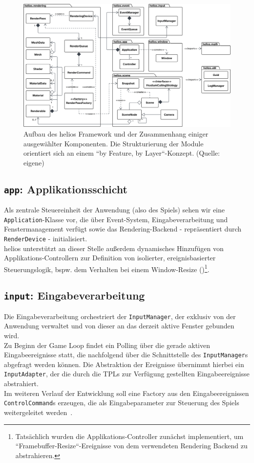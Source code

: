 \begin{figure}[t]
    \centering
    \includegraphics[width=1\textwidth]{img/package_diagram.svg}%
    \caption{Aufbau des helios Framework und der Zusammenhang einiger ausgewählter Komponenten. Die Strukturierung der Module orientiert sich an einem ``by Feature, by Layer``-Konzept. (Quelle: eigene)}
    \label{fig:package_diagram}
\end{figure}


\subsection*{\texttt{app}: Applikationsschicht}
Als zentrale Steuereinheit der Anwendung (also des Spiels) sehen wir eine \texttt{Application}-Klasse vor, die über Event-System, Eingabeverarbeitung und Fenstermanagement verfügt sowie das Rendering-Backend - repräsentiert durch \texttt{RenderDevice} - initialisiert.\\
helios unterstützt an dieser Stelle außerdem dynamisches Hinzufügen von Applikations-Controllern zur Definition von isolierter, ereignisbasierter Steuerungslogik, bspw. dem Verhalten bei einem Window-Resize (\cite[379]{Fow03})\footnote{
Tatsächlich wurden die Applikations-Controller zunächst implementiert, um ``Framebuffer-Resize``-Ereignisse von dem verwendeten Rendering Backend zu abstrahieren.
}.

\subsection*{\texttt{input}: Eingabeverarbeitung}
Die Eingabeverarbeitung orchestriert der \texttt{InputManager}, der exklusiv von der Anwendung verwaltet und von dieser an das derzeit aktive Fenster gebunden wird.\\
Zu Beginn der Game Loop findet ein Polling über die gerade aktiven Eingabeereignisse statt, die nachfolgend über die Schnittstelle des \texttt{InputManager}s abgefragt werden können.
Die Abstraktion der Ereignisse übernimmt hierbei ein \texttt{InputAdapter}, der die durch die TPLs zur Verfügung gestellten Eingabeereignisse abstrahiert.\\
Im weiteren Verlauf der Entwicklung soll eine Factory aus den Eingabeereignissen \texttt{ControlCommand}s erzeugen, die als Eingabeparameter zur Steuerung des Spiels weitergeleitet werden~\cite[21 ff.]{Nys14}.

